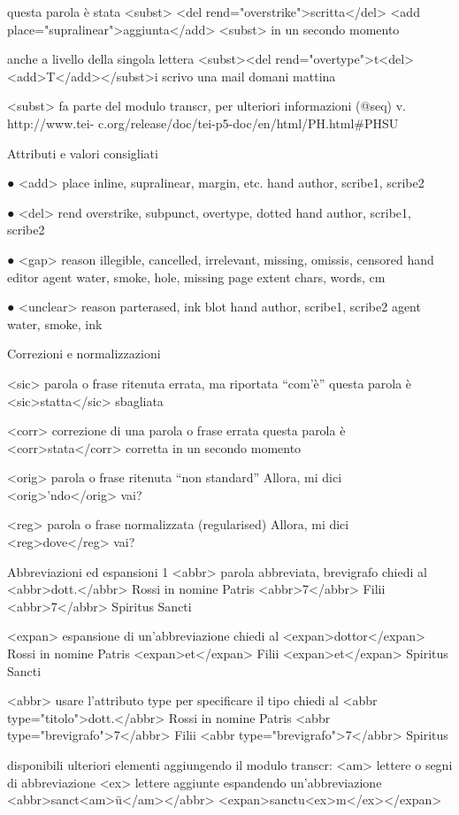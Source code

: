 questa parola è stata <subst>
<del rend="overstrike">scritta</del>
<add place="supralinear">aggiunta</add>
<subst> in un secondo momento

anche a livello della singola lettera
<subst><del rend="overtype">t<del><add>T</add></subst>i scrivo una
   mail domani mattina

   <subst> fa parte del modulo transcr, per ulteriori informazioni (@seq) v. http://www.tei- c.org/release/doc/tei-p5-doc/en/html/PH.html#PHSU

Attributi e valori consigliati

● <add> 
place inline, supralinear, margin, etc.
hand author, scribe1, scribe2

● <del> 
rend overstrike, subpunct, overtype, dotted
hand author, scribe1, scribe2

● <gap>
reason illegible, cancelled, irrelevant, missing, omissis, censored 
hand editor
agent water, smoke, hole, missing page
extent chars, words, cm

● <unclear> 
reason parterased, ink blot 
hand author, scribe1, scribe2
agent water, smoke, ink

Correzioni e normalizzazioni

 <sic> parola o frase ritenuta errata, ma riportata “com’è”
questa parola è <sic>statta</sic> sbagliata

<corr> correzione di una parola o frase errata
questa parola è <corr>stata</corr> corretta in un
 secondo momento

<orig> parola o frase ritenuta “non standard” 
Allora, mi dici <orig>’ndo</orig> vai?

<reg> parola o frase normalizzata (regularised) Allora, mi dici <reg>dove</reg> vai?


Abbreviazioni ed espansioni 1 <abbr> parola abbreviata, brevigrafo
 chiedi al <abbr>dott.</abbr> Rossi
 in nomine Patris <abbr>7</abbr> Filii
 <abbr>7</abbr> Spiritus Sancti

<expan> espansione di un’abbreviazione chiedi al <expan>dottor</expan> Rossi
 in nomine Patris <expan>et</expan> Filii
 <expan>et</expan> Spiritus Sancti

 
<abbr> usare l’attributo type per specificare il tipo chiedi al <abbr type="titolo">dott.</abbr> Rossi
 in nomine Patris <abbr type="brevigrafo">7</abbr> Filii
 <abbr type="brevigrafo">7</abbr> Spiritus

disponibili ulteriori elementi aggiungendo il modulo transcr:
<am> lettere o segni di abbreviazione
<ex> lettere aggiunte espandendo un’abbreviazione
 <abbr>sanct<am>ū</am></abbr>
 <expan>sanctu<ex>m</ex></expan>

